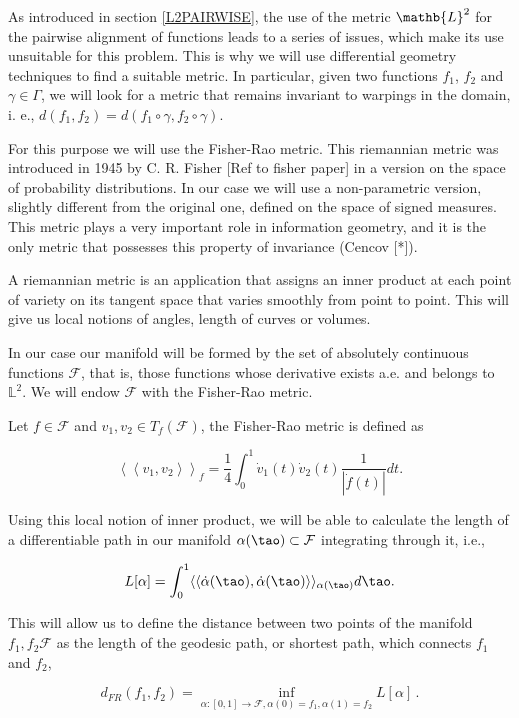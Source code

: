 As introduced in section \ref{L2PAIRWISE}, the use of the metric $\mathb{L}^2$
for the pairwise alignment of functions leads to a series of issues, which make
its use unsuitable for this problem. This is why we will use differential
geometry techniques to find a suitable metric. In particular, given two
functions $f_1$, $f_2$ and $\gamma \in \Gamma$, we will look for a metric that
remains invariant to warpings in the domain, i. e.,
$d(f_1, f_2) = d(f_1 \circ \gamma, f_2 \circ \gamma)$.

For this purpose we will use the Fisher-Rao metric. This riemannian metric was
introduced in 1945 by C. R. Fisher [Ref to fisher paper] in a version on the
space of probability distributions. In our case we will use a non-parametric
version, slightly different from the original one, defined on the space of
signed measures. This metric plays a very important role in information
geometry, and it is the only metric that possesses this property of
invariance (Cencov [*]).

A riemannian metric is an application that assigns an inner product at each
point of variety on its tangent space that varies smoothly from point to point.
This will give us local notions of angles, length of curves or volumes.

In our case our manifold will be formed by the set of absolutely continuous
functions $\mathcal{F}$, that is, those functions whose derivative exists a.e.
and belongs to $\mathbb{L}^2$. We will endow $\mathcal{F}$ with the
Fisher-Rao metric.

Let $f \in \mathcal{F}$  and $v_{1}, v_{2} \in T_{f}(\mathcal{F})$,
the Fisher-Rao metric is defined as

$$
\left\langle\left\langle v_{1}, v_{2}\right\rangle\right\rangle_{f}=
\frac{1}{4} \int_{0}^{1} \dot{v}_{1}(t) \dot{v}_{2}(t) \frac{1}{|\dot{f}(t)|}dt.
$$

Using this local notion of inner product, we will be able to calculate the
length of a differentiable path in our manifold
$\alpha(\tao) \subset \mathcal{F}$ integrating through it, i.e.,

$$
L[\alpha] = \int_0^1 \langle \langle \dot \alpha(\tao), \dot \alpha(\tao)
\rangle \rangle_{\alpha(\tao)} d\tao.
$$

This will allow us to define the distance between two points of the
manifold $f_1, f_2 \mathcal{F}$ as the length of the geodesic path, or shortest
path, which connects $f_1$ and $f_2$,

$$
d_{F R}\left(f_{1}, f_{2}\right)=\inf _{\alpha :[0,1]
\rightarrow \mathcal{F}, \alpha(0)=f_{1}, \alpha(1)=f_{2}} L[\alpha] \, .
$$

